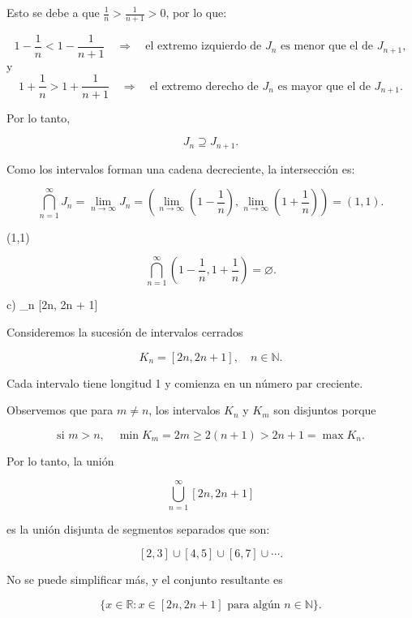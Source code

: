 Esto se debe a que \( \frac{1}{n} > \frac{1}{n+1} > 0 \), por lo que:

\[
1 - \frac{1}{n} < 1 - \frac{1}{n+1} \quad \Rightarrow \quad \text{el extremo izquierdo de } J_n \text{ es menor que el de } J_{n+1},
\]
y
\[
1 + \frac{1}{n} > 1 + \frac{1}{n+1} \quad \Rightarrow \quad \text{el extremo derecho de } J_n \text{ es mayor que el de } J_{n+1}.
\]

Por lo tanto,

\[
J_n \supseteq J_{n+1}.
\]

\medskip

Como los intervalos forman una cadena decreciente, la intersección es:

\[
\bigcap_{n=1}^\infty J_n = \lim_{n \to \infty} J_n = \left(\lim_{n \to \infty} \left(1 - \frac{1}{n}\right), \lim_{n \to \infty} \left(1 + \frac{1}{n}\right) \right) = (1, 1).
\]

\medskip

 (1,1) 

\[
\bigcap_{n=1}^\infty \left(1 - \frac{1}{n}, 1 + \frac{1}{n}\right) = \varnothing.
\]

\bigskip

c) \displaystyle \bigcup_{n \in {}} [2n, 2n + 1]

\medskip

Consideremos la sucesión de intervalos cerrados

\[
K_n = [2n, 2n + 1], \quad n \in \mathbb{N}.
\]

Cada intervalo tiene longitud 1 y comienza en un número par creciente.

\medskip

Observemos que para \( m \neq n \), los intervalos \( K_n \) y \( K_m \) son disjuntos porque

\[
\text{si } m > n, \quad \min K_m = 2m \geq 2(n+1) > 2n + 1 = \max K_n.
\]

\medskip

Por lo tanto, la unión

\[
\bigcup_{n=1}^\infty [2n, 2n + 1]
\]

es la unión disjunta de segmentos separados que son:

\[
[2,3] \cup [4,5] \cup [6,7] \cup \cdots.
\]

\medskip

No se puede simplificar más, y el conjunto resultante es

\[
\{ x \in \mathbb{R} : x \in [2n, 2n+1] \text{ para algún } n \in \mathbb{N} \}.
\]